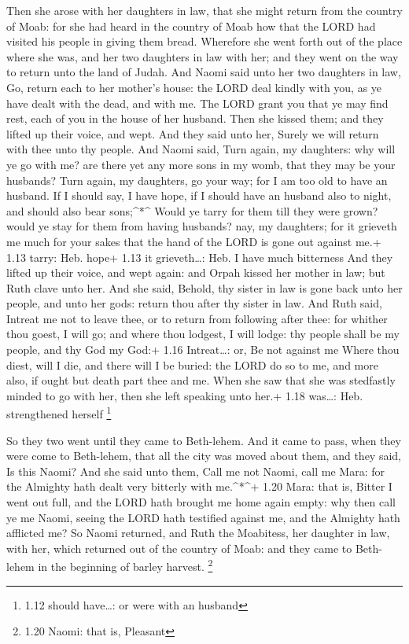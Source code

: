  Then she arose with her daughters in law, that she might
return from the country of Moab: for she had heard in the country of
Moab how that the LORD had visited his people in giving them bread.
 Wherefore she went forth out of the place where she was,
and her two daughters in law with her; and they went on the way to
return unto the land of Judah.  And Naomi said unto her two
daughters in law, Go, return each to her mother's house: the LORD deal
kindly with you, as ye have dealt with the dead, and with me.
 The LORD grant you that ye may find rest, each of you in
the house of her husband. Then she kissed them; and they lifted up their
voice, and wept.  And they said unto her, Surely we will
return with thee unto thy people.  And Naomi said, Turn
again, my daughters: why will ye go with me? are there yet any more sons
in my womb, that they may be your husbands?  Turn again, my
daughters, go your way; for I am too old to have an husband. If I should
say, I have hope, if I should have an husband also to night, and should
also bear sons;\^{}*\^{}  Would ye tarry for them till they
were grown? would ye stay for them from having husbands? nay, my
daughters; for it grieveth me much for your sakes that the hand of the
LORD is gone out against me.+ 1.13 tarry: Heb. hope+ 1.13 it
grieveth\ldots: Heb. I have much bitterness  And they
lifted up their voice, and wept again: and Orpah kissed her mother in
law; but Ruth clave unto her.  And she said, Behold, thy
sister in law is gone back unto her people, and unto her gods: return
thou after thy sister in law.  And Ruth said, Intreat me
not to leave thee, or to return from following after thee: for whither
thou goest, I will go; and where thou lodgest, I will lodge: thy people
shall be my people, and thy God my God:+ 1.16 Intreat\ldots: or, Be not
against me  Where thou diest, will I die, and there will I
be buried: the LORD do so to me, and more also, if ought but death part
thee and me.  When she saw that she was stedfastly minded
to go with her, then she left speaking unto her.+ 1.18 was\ldots: Heb.
strengthened herself \footnote{1.12 should have\ldots: or were with an
  husband}

 So they two went until they came to Beth-lehem. And it
came to pass, when they were come to Beth-lehem, that all the city was
moved about them, and they said, Is this Naomi?  And she
said unto them, Call me not Naomi, call me Mara: for the Almighty hath
dealt very bitterly with me.\^{}*\^{}+ 1.20 Mara: that is, Bitter
 I went out full, and the LORD hath brought me home again
empty: why then call ye me Naomi, seeing the LORD hath testified against
me, and the Almighty hath afflicted me?  So Naomi returned,
and Ruth the Moabitess, her daughter in law, with her, which returned
out of the country of Moab: and they came to Beth-lehem in the beginning
of barley harvest. \footnote{1.20 Naomi: that is, Pleasant}

